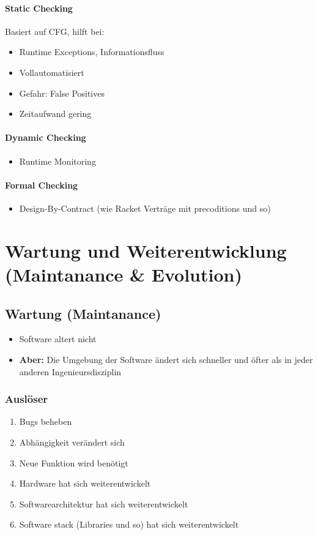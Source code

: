 \documentclass[ngerman,color=3b]{tuda_summary}
\begin{document}
\paragraph{Static Checking}
Basiert auf CFG, hilft bei:
\begin{itemize}
    \item Runtime Exceptions, Informationsfluss
    \item Vollautomatisiert
    \item Gefahr: False Positives
    \item Zeitaufwand gering
\end{itemize}
\vspace*{-1ex}
\paragraph{Dynamic Checking}\begin{itemize}
    \item Runtime Monitoring
\end{itemize}
\vspace*{-1ex}
\paragraph{Formal Checking}\begin{itemize}
    \item Design-By-Contract (wie Racket Verträge mit precoditions und so)
\end{itemize}

\clearpage
\section{Wartung und Weiterentwicklung (Maintanance \& Evolution)}
\subsection{Wartung (Maintanance)}
\begin{itemize}
    \item Software altert nicht
    \item \textbf{Aber:} Die Umgebung der Software ändert sich schneller und öfter als in jeder anderen Ingenieursdisziplin
\end{itemize}
\subsubsection{Auslöser}
\begin{enumerate}
    \item Bugs beheben
    \item Abhängigkeit verändert sich
    \item Neue Funktion wird benötigt
    \item Hardware hat sich weiterentwickelt
    \item Softwarearchitektur hat sich weiterentwickelt
    \item Software stack (Libraries und so) hat sich weiterentwickelt
\end{enumerate}
\end{document}
